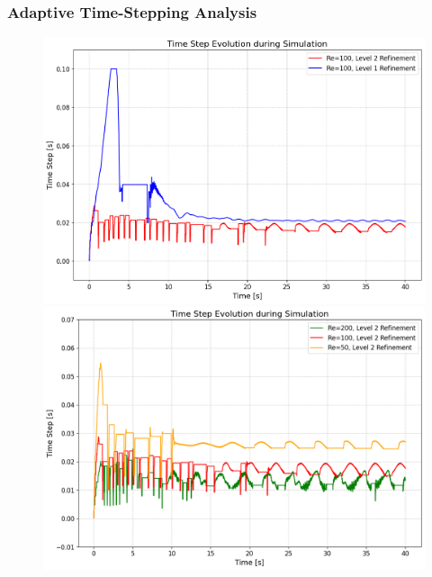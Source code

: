\documentclass{settings/laserbeam}
\begin{document}
\begin{frame}
    
    \frametitle{Adaptive Time-Stepping Analysis}

    \begin{center}
        \begin{figure}[H]
            \begin{minipage}{0.43\linewidth}
                \begin{center}
                   \includegraphics[width=1\linewidth]{images/Ref_Level_Comp.png}
                \end{center}
            \end{minipage}
            \qquad
            \qquad
            \begin{minipage}{0.43\linewidth}
                \begin{center}
                    \includegraphics[width=1\linewidth]{images/Re_Comp.png}

\end{center}
\end{minipage}
\end{figure}
\end{center}
\end{frame}
\end{document}
